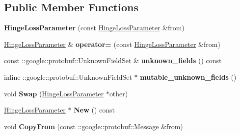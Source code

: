 \subsection*{Public Member Functions}
\begin{DoxyCompactItemize}
\item 
\mbox{\label{classcaffe_1_1_hinge_loss_parameter_a646c3a3a3c243625279565b49d13bbcc}} 
{\bfseries Hinge\+Loss\+Parameter} (const \mbox{\hyperlink{classcaffe_1_1_hinge_loss_parameter}{Hinge\+Loss\+Parameter}} \&from)
\item 
\mbox{\label{classcaffe_1_1_hinge_loss_parameter_a58bab973414f0c2b7247e3fcfe07defc}} 
\mbox{\hyperlink{classcaffe_1_1_hinge_loss_parameter}{Hinge\+Loss\+Parameter}} \& {\bfseries operator=} (const \mbox{\hyperlink{classcaffe_1_1_hinge_loss_parameter}{Hinge\+Loss\+Parameter}} \&from)
\item 
\mbox{\label{classcaffe_1_1_hinge_loss_parameter_a90df3f2dc9f0053e1c17a988bd2492f4}} 
const \+::google\+::protobuf\+::\+Unknown\+Field\+Set \& {\bfseries unknown\+\_\+fields} () const
\item 
\mbox{\label{classcaffe_1_1_hinge_loss_parameter_a581eec65ef6f8161c1b3d59ced650eef}} 
inline \+::google\+::protobuf\+::\+Unknown\+Field\+Set $\ast$ {\bfseries mutable\+\_\+unknown\+\_\+fields} ()
\item 
\mbox{\label{classcaffe_1_1_hinge_loss_parameter_a71f1261f678ef55e9b0b30a9c1752f1c}} 
void {\bfseries Swap} (\mbox{\hyperlink{classcaffe_1_1_hinge_loss_parameter}{Hinge\+Loss\+Parameter}} $\ast$other)
\item 
\mbox{\label{classcaffe_1_1_hinge_loss_parameter_ab98e68389b3df3c3710fe8515e2fa7e1}} 
\mbox{\hyperlink{classcaffe_1_1_hinge_loss_parameter}{Hinge\+Loss\+Parameter}} $\ast$ {\bfseries New} () const
\item 
\mbox{\label{classcaffe_1_1_hinge_loss_parameter_abbfe49de7f959650dcef0b5073f1e0d9}} 
void {\bfseries Copy\+From} (const \+::google\+::protobuf\+::\+Message \&from)

\end{DoxyCompactItemize}
